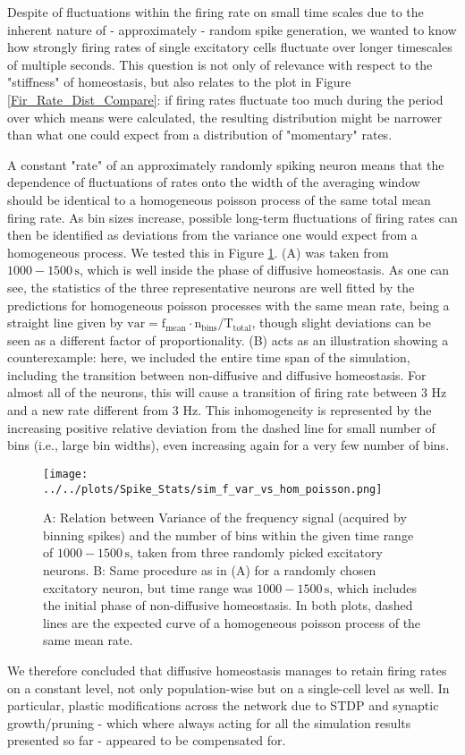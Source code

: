 \documentclass[10pt,a4paper]{article}
\begin{document}
Despite of fluctuations within the firing rate on small time scales due to the inherent nature of - approximately - random spike generation, we wanted to know how strongly firing rates of single excitatory cells fluctuate over longer timescales of multiple seconds. This question is not only of relevance with respect to the "stiffness" of homeostasis, but also relates to the plot in Figure \ref{Fir_Rate_Dist_Compare}: if firing rates fluctuate too much during the period over which means were calculated, the resulting distribution might be narrower than what one could expect from a distribution of "momentary" rates.

A constant "rate" of an approximately randomly spiking neuron means that the dependence of fluctuations of rates onto the width of the averaging window should be identical to a homogeneous poisson process of the same total mean firing rate. As bin sizes increase, possible long-term fluctuations of firing rates can then be identified as deviations from the variance one would expect from a homogeneous process. We tested this in Figure \ref{f_Var_vs_n_Bin}. (A) was taken from $\mathrm{1000-1500\,s}$, which is well inside the phase of diffusive homeostasis. As one can see, the statistics of the three representative neurons are well fitted by the predictions for homogeneous poisson processes with the same mean rate, being a straight line given by $\mathrm{var = f_{mean}\cdot n_{bins}/T_{total}}$, though slight deviations can be seen as a different factor of proportionality. (B) acts as an illustration showing a counterexample: here, we included the entire time span of the simulation, including the transition between non-diffusive and diffusive homeostasis. For almost all of the neurons, this will cause a transition of firing rate between 3 Hz and a new rate different from 3 Hz. This inhomogeneity is represented by the increasing positive relative deviation from the dashed line for small number of bins (i.e., large bin widths), even increasing again for a very few number of bins.
\begin{figure}
\texttt{[image: ../../plots/Spike\_Stats/sim\_f\_var\_vs\_hom\_poisson.png]}
\caption{A: Relation between Variance of the frequency signal (acquired by binning spikes) and the number of bins within the given time range of $\mathrm{1000-1500\,s}$, taken from three randomly picked excitatory neurons. B: Same procedure as in (A) for a randomly chosen excitatory neuron, but time range was $\mathrm{1000-1500\,s}$, which includes the initial phase of non-diffusive homeostasis. In both plots, dashed lines are the expected curve of a homogeneous poisson process of the same mean rate.}
\label{f_Var_vs_n_Bin}
\end{figure}
We therefore concluded that diffusive homeostasis manages to retain firing rates on a constant level, not only population-wise but on a single-cell level as well. In particular, plastic modifications across the network due to STDP and synaptic growth/pruning - which where always acting for all the simulation results presented so far - appeared to be compensated for.
\end{document}
